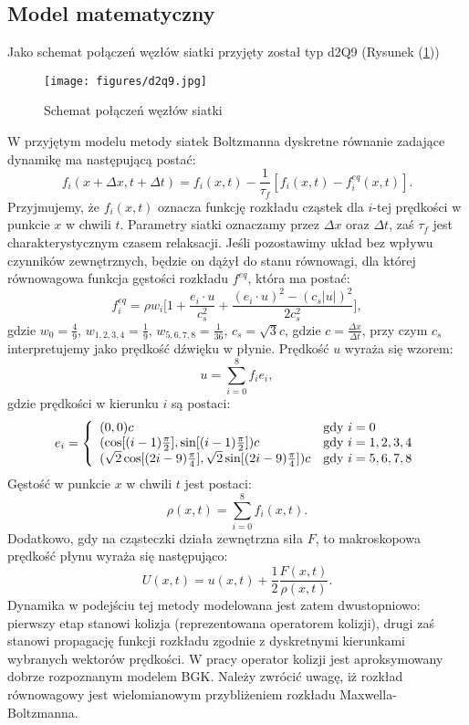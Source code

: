 \documentclass[12pt, twoside]{book}
\begin{document}
\subsection{Model matematyczny}
Jako schemat połączeń węzłów siatki przyjęty został typ d2Q9 (Rysunek (\ref{Fig26}))
\begin{figure}[H]
	\texttt{[image: figures/d2q9.jpg]} 
	\centering
	\caption{Schemat połączeń węzłów siatki}
	\label{Fig26}
\end{figure}
W przyjętym modelu metody siatek Boltzmanna dyskretne równanie zadające dynamikę ma następującą postać:
\begin{equation}
f_{i}(x + \Delta x, t + \Delta t) = f_{i}(x,t) - \frac{1}{\tau_f}[f_{i}(x,t) - f_{i}^{eq}(x,t)].
\end{equation}
Przyjmujemy, że $f_{i}(x,t)$ oznacza funkcję rozkładu cząstek dla $i$-tej prędkości w punkcie $x$ w chwili $t$. Parametry siatki oznaczamy przez $\Delta x$ oraz $\Delta t$, zaś $\tau_f$ jest charakterystycznym czasem relaksacji.
Jeśli pozostawimy układ bez wpływu czynników zewnętrznych, będzie on dążył do stanu równowagi, dla której równowagowa funkcja gęstości rozkładu $f^{eq}$, która ma postać:
\begin{equation}
f_{i}^{eq} = \rho w_{i} \Bigg[1 + \frac{e_i \cdot u}{c_{s}^{2}} + 
\frac{(e_i \cdot u)^2 - (c_s|u|)^2}{2 c_{s}^{2}}\Bigg],
\end{equation}
gdzie $w_0 = \frac{4}{9}$, $w_{1,2,3,4} = \frac{1}{9}$, $w_{5,6,7,8} = \frac{1}{36}$, $c_s = \sqrt{3}c$, gdzie $c = \frac{\Delta x}{\Delta t}$, przy czym $c_s$ interpretujemy jako prędkość dźwięku w płynie. Prędkość $u$ wyraża się wzorem:
\begin{equation}
u = \sum_{i=0}^{8}f_{i}e_{i},
\end{equation}
gdzie prędkości w kierunku $i$ są postaci:
\begin{equation}
e_i = \left\{ \begin{array}{ll}
(0,0)c & \textrm{gdy $i = 0$}\\
(\cos[(i-1)\frac{\pi}{2}], \sin[(i-1)\frac{\pi}{2}])c & \textrm{gdy $i=1,2,3,4$}\\
(\sqrt{2}\cos[(2i-9)\frac{\pi}{4}],\sqrt{2}\sin[(2i-9)\frac{\pi}{4}])c & \textrm{gdy $ i=5,6,7,8 $}
\end{array} \right.
\end{equation}
Gęstość w punkcie $x$ w chwili $t$ jest postaci:
\begin{equation}
\rho(x,t) = \sum_{i=0}^{8}f_{i}(x,t).
\end{equation}
Dodatkowo, gdy na cząsteczki działa zewnętrzna siła $F$, to makroskopowa prędkość płynu wyraża się następująco:
\begin{equation}
U(x,t) = u(x,t) + \frac{1}{2}\frac{F(x,t)}{\rho(x,t)}.
\end{equation}
Dynamika w podejściu tej metody modelowana jest zatem dwustopniowo: pierwszy etap stanowi kolizja (reprezentowana operatorem kolizji), drugi zaś stanowi propagację funkcji rozkładu zgodnie z dyskretnymi kierunkami wybranych wektorów prędkości. W pracy operator kolizji jest aproksymowany dobrze rozpoznanym modelem BGK. Należy zwrócić uwagę, iż rozkład równowagowy jest wielomianowym przybliżeniem rozkładu Maxwella-Boltzmanna.\newline
\end{document}
